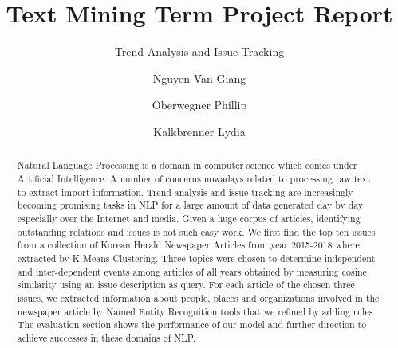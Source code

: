 \documentclass[sigconf, natbib=false]{acmart}
\title{Text Mining Term Project Report}
\subtitle{Trend Analysis and Issue Tracking}
\author{Nguyen Van Giang}
\affiliation{20184658}
\author{Oberwegner Phillip}
\affiliation{20186509}
\author{Kalkbrenner Lydia}
\affiliation{20186481}
\begin{document}
\begin{abstract}
Natural Language Processing is a domain in computer science which comes under Artificial Intelligence. A number of concerns nowadays related to processing raw text to extract import information.
Trend analysis and issue tracking are increasingly becoming promising tasks in NLP for a large amount of data generated day by day especially over the Internet and media. Given a huge corpus of articles, identifying outstanding relations and issues is not such easy work.
We first find the top ten issues from a collection of Korean Herald Newspaper Articles from year 2015-2018 where extracted by K-Means Clustering. 
Three topics were chosen to determine independent and inter-dependent events among articles of all years obtained by measuring cosine similarity using an issue description as query. 
For each article of the chosen three issues, we extracted information about people, places and organizations involved in the newspaper article by Named Entity Recognition tools that we refined by adding rules.
The evaluation section shows the performance of our model and further direction to achieve successes in these domains of NLP.
\end{abstract}

\maketitle










% 
% 
\printbibliography
\end{document}
